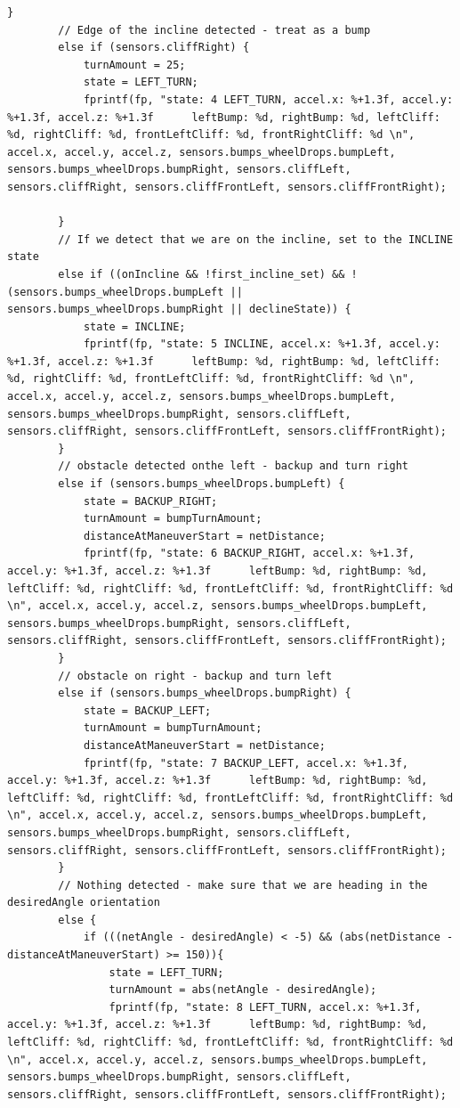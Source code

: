 \documentclass[twoside]{article}
\begin{document}
\begin{lstlisting}[mathescape, frame=single]
        }
		// Edge of the incline detected - treat as a bump
        else if (sensors.cliffRight) {
            turnAmount = 25;
            state = LEFT_TURN;
            fprintf(fp, "state: 4 LEFT_TURN, accel.x: %+1.3f, accel.y: %+1.3f, accel.z: %+1.3f      leftBump: %d, rightBump: %d, leftCliff: %d, rightCliff: %d, frontLeftCliff: %d, frontRightCliff: %d \n", accel.x, accel.y, accel.z, sensors.bumps_wheelDrops.bumpLeft, sensors.bumps_wheelDrops.bumpRight, sensors.cliffLeft, sensors.cliffRight, sensors.cliffFrontLeft, sensors.cliffFrontRight);

        }
		// If we detect that we are on the incline, set to the INCLINE state
        else if ((onIncline && !first_incline_set) && !(sensors.bumps_wheelDrops.bumpLeft || sensors.bumps_wheelDrops.bumpRight || declineState)) {
            state = INCLINE;
            fprintf(fp, "state: 5 INCLINE, accel.x: %+1.3f, accel.y: %+1.3f, accel.z: %+1.3f      leftBump: %d, rightBump: %d, leftCliff: %d, rightCliff: %d, frontLeftCliff: %d, frontRightCliff: %d \n", accel.x, accel.y, accel.z, sensors.bumps_wheelDrops.bumpLeft, sensors.bumps_wheelDrops.bumpRight, sensors.cliffLeft, sensors.cliffRight, sensors.cliffFrontLeft, sensors.cliffFrontRight);
        }
		// obstacle detected onthe left - backup and turn right
        else if (sensors.bumps_wheelDrops.bumpLeft) {
            state = BACKUP_RIGHT;
            turnAmount = bumpTurnAmount;
            distanceAtManeuverStart = netDistance;
            fprintf(fp, "state: 6 BACKUP_RIGHT, accel.x: %+1.3f, accel.y: %+1.3f, accel.z: %+1.3f      leftBump: %d, rightBump: %d, leftCliff: %d, rightCliff: %d, frontLeftCliff: %d, frontRightCliff: %d \n", accel.x, accel.y, accel.z, sensors.bumps_wheelDrops.bumpLeft, sensors.bumps_wheelDrops.bumpRight, sensors.cliffLeft, sensors.cliffRight, sensors.cliffFrontLeft, sensors.cliffFrontRight);
        }
		// obstacle on right - backup and turn left
        else if (sensors.bumps_wheelDrops.bumpRight) {
            state = BACKUP_LEFT;
            turnAmount = bumpTurnAmount;
            distanceAtManeuverStart = netDistance;
            fprintf(fp, "state: 7 BACKUP_LEFT, accel.x: %+1.3f, accel.y: %+1.3f, accel.z: %+1.3f      leftBump: %d, rightBump: %d, leftCliff: %d, rightCliff: %d, frontLeftCliff: %d, frontRightCliff: %d \n", accel.x, accel.y, accel.z, sensors.bumps_wheelDrops.bumpLeft, sensors.bumps_wheelDrops.bumpRight, sensors.cliffLeft, sensors.cliffRight, sensors.cliffFrontLeft, sensors.cliffFrontRight);
        }
		// Nothing detected - make sure that we are heading in the desiredAngle orientation
        else {
            if (((netAngle - desiredAngle) < -5) && (abs(netDistance - distanceAtManeuverStart) >= 150)){
                state = LEFT_TURN;
                turnAmount = abs(netAngle - desiredAngle);
                fprintf(fp, "state: 8 LEFT_TURN, accel.x: %+1.3f, accel.y: %+1.3f, accel.z: %+1.3f      leftBump: %d, rightBump: %d, leftCliff: %d, rightCliff: %d, frontLeftCliff: %d, frontRightCliff: %d \n", accel.x, accel.y, accel.z, sensors.bumps_wheelDrops.bumpLeft, sensors.bumps_wheelDrops.bumpRight, sensors.cliffLeft, sensors.cliffRight, sensors.cliffFrontLeft, sensors.cliffFrontRight);


\end{lstlisting}
\end{document}
